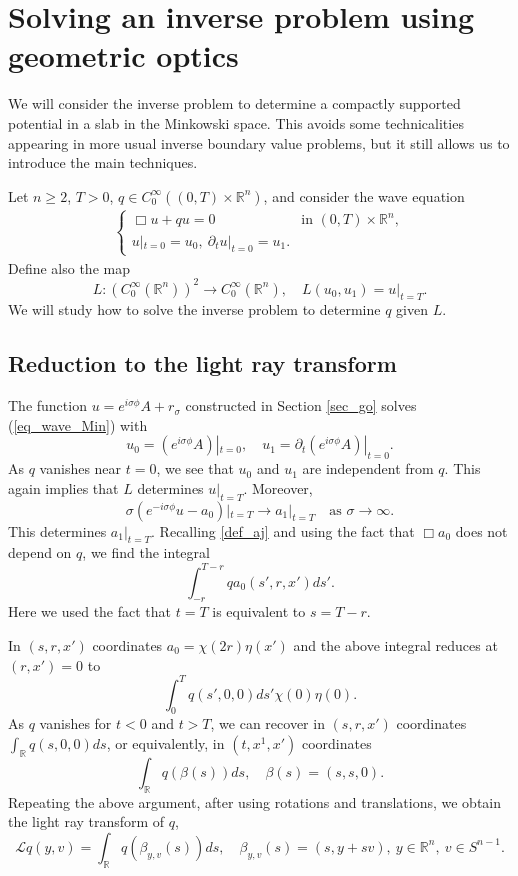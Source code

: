 \documentclass[12pt,oneside,final]{amsart}
\def\p{\partial}
\def\R{\mathbb R}
\begin{document}
\section{Solving an inverse problem using geometric optics}

We will consider the inverse problem to determine a compactly supported potential in a slab in the Minkowski space.
This avoids some technicalities appearing in more usual inverse boundary value problems, but it still allows us to introduce the main techniques. 

Let $n \ge 2$, $T > 0$, $q \in C_0^\infty((0,T) \times \R^n)$, and consider the wave equation 
\begin{align*}
\begin{cases}
\Box u + q u = 0 & \text{in $(0,T) \times \R^n$},
\\
u|_{t=0} = u_0,\ \p_t u|_{t=0} = u_1.
\end{cases}
\end{align*}
Define also the map 
$$
L : (C_0^\infty(\R^n))^2 \to C_0^\infty(\R^n),
\quad L (u_0, u_1) = u|_{t=T}.
$$
We will study how to solve the inverse problem to determine $q$ given $L$.


\subsection{Reduction to the light ray transform}
The function $u = e^{i \sigma \phi} A + r_\sigma$ constructed in Section \ref{sec_go}
solves (\ref{eq_wave_Min}) with 
$$
u_0 = (e^{i \sigma \phi} A)|_{t=0}, \quad 
u_1 = \p_t (e^{i \sigma \phi} A)|_{t=0}.
$$
As $q$ vanishes near $t=0$, we see that $u_0$ and $u_1$ are independent from $q$.
This again implies that $L$ determines $u|_{t=T}$. 
Moreover, 
$$
\sigma (e^{-i \sigma \phi} u - a_0)|_{t=T}
\to a_1|_{t=T} \quad \text{as $\sigma \to \infty$}.
$$
This determines $a_1|_{t=T}$. 
Recalling \eqref{def_aj} and using the fact that $\Box a_0$ does not depend on $q$, we find the integral 
$$
\int_{-r}^{T-r} q a_{0}(s',r,x') ds'.
$$
Here we used the fact that $t=T$ is equivalent to $s = T-r$. 

In $(s,r,x')$ coordinates $a_0 = \chi(2 r) \eta(x')$ and the above integral reduces at $(r,x')=0$ to
$$
\int_{0}^{T} q(s', 0, 0) ds' \chi(0) \eta(0).
$$
As $q$ vanishes for $t < 0$ and $t > T$, we can recover
in $(s,r,x')$ coordinates $\int_\R q(s,0,0) ds$, or equivalently, in $(t,x^1,x')$ coordinates 
$$
\int_\R q (\beta (s)) ds, \quad \beta(s) = (s,s,0).
$$
Repeating the above argument, after using rotations and translations, we obtain the light ray transform of $q$,
$$
\mathcal L q(y,v) = \int_\R q (\beta_{y,v} (s)) ds, \quad \beta_{y,v}(s) = (s,y + sv),\ y \in \R^n,\ v \in S^{n-1}.
$$
\end{document}
